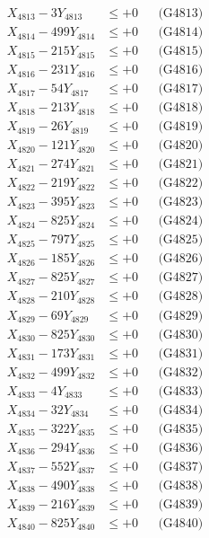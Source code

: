 \documentclass[a4paper,10pt]{article}
\begin{document}
{\begin{align}
X_{4813} - 3Y_{4813} &\leq +0 && \text{(G4813)} \\
X_{4814} - 499Y_{4814} &\leq +0 && \text{(G4814)} \\
X_{4815} - 215Y_{4815} &\leq +0 && \text{(G4815)} \\
X_{4816} - 231Y_{4816} &\leq +0 && \text{(G4816)} \\
X_{4817} - 54Y_{4817} &\leq +0 && \text{(G4817)} \\
X_{4818} - 213Y_{4818} &\leq +0 && \text{(G4818)} \\
X_{4819} - 26Y_{4819} &\leq +0 && \text{(G4819)} \\
X_{4820} - 121Y_{4820} &\leq +0 && \text{(G4820)} \\
\allowbreak
X_{4821} - 274Y_{4821} &\leq +0 && \text{(G4821)} \\
X_{4822} - 219Y_{4822} &\leq +0 && \text{(G4822)} \\
X_{4823} - 395Y_{4823} &\leq +0 && \text{(G4823)} \\
X_{4824} - 825Y_{4824} &\leq +0 && \text{(G4824)} \\
X_{4825} - 797Y_{4825} &\leq +0 && \text{(G4825)} \\
X_{4826} - 185Y_{4826} &\leq +0 && \text{(G4826)} \\
X_{4827} - 825Y_{4827} &\leq +0 && \text{(G4827)} \\
X_{4828} - 210Y_{4828} &\leq +0 && \text{(G4828)} \\
X_{4829} - 69Y_{4829} &\leq +0 && \text{(G4829)} \\
X_{4830} - 825Y_{4830} &\leq +0 && \text{(G4830)} \\
\allowbreak
X_{4831} - 173Y_{4831} &\leq +0 && \text{(G4831)} \\
X_{4832} - 499Y_{4832} &\leq +0 && \text{(G4832)} \\
X_{4833} - 4Y_{4833} &\leq +0 && \text{(G4833)} \\
X_{4834} - 32Y_{4834} &\leq +0 && \text{(G4834)} \\
X_{4835} - 322Y_{4835} &\leq +0 && \text{(G4835)} \\
X_{4836} - 294Y_{4836} &\leq +0 && \text{(G4836)} \\
X_{4837} - 552Y_{4837} &\leq +0 && \text{(G4837)} \\
X_{4838} - 490Y_{4838} &\leq +0 && \text{(G4838)} \\
X_{4839} - 216Y_{4839} &\leq +0 && \text{(G4839)} \\
X_{4840} - 825Y_{4840} &\leq +0 && \text{(G4840)} \\

\end{align}}
\end{document}
